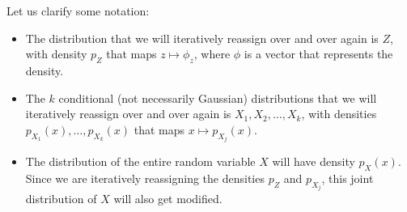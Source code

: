       Let us clarify some notation: 
      \begin{itemize}
        \item The distribution that we will iteratively reassign over and over again is $Z$, with density $p_Z$ that maps $z \mapsto \phi_z$, where $\phi$ is a vector that represents the density.
        \item The $k$ conditional (not necessarily Gaussian) distributions that we will iteratively reassign over and over again is $X_1, X_2, \ldots, X_k$, with densities $p_{X_1} (x), \ldots, p_{X_k} (x)$ that maps $x \mapsto p_{X_j} (x)$.
        \item The distribution of the entire random variable $X$ will have density $p_X (x)$. Since we are iteratively reassigning the densities $p_Z$ and $p_{X_j}$, this joint distribution of $X$ will also get modified.
      \end{itemize}


